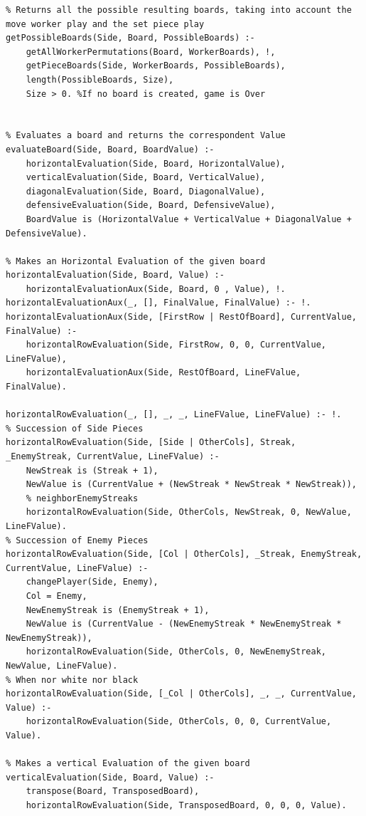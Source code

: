 \documentclass[a4paper]{article}
\begin{document}
\begin{lstlisting}
% Returns all the possible resulting boards, taking into account the move worker play and the set piece play
getPossibleBoards(Side, Board, PossibleBoards) :-
	getAllWorkerPermutations(Board, WorkerBoards), !,
	getPieceBoards(Side, WorkerBoards, PossibleBoards),
	length(PossibleBoards, Size),
	Size > 0. %If no board is created, game is Over


% Evaluates a board and returns the correspondent Value
evaluateBoard(Side, Board, BoardValue) :-
	horizontalEvaluation(Side, Board, HorizontalValue),
	verticalEvaluation(Side, Board, VerticalValue),
	diagonalEvaluation(Side, Board, DiagonalValue),
	defensiveEvaluation(Side, Board, DefensiveValue),
	BoardValue is (HorizontalValue + VerticalValue + DiagonalValue + DefensiveValue).

% Makes an Horizontal Evaluation of the given board
horizontalEvaluation(Side, Board, Value) :-
	horizontalEvaluationAux(Side, Board, 0 , Value), !.
horizontalEvaluationAux(_, [], FinalValue, FinalValue) :- !.
horizontalEvaluationAux(Side, [FirstRow | RestOfBoard], CurrentValue, FinalValue) :-
	horizontalRowEvaluation(Side, FirstRow, 0, 0, CurrentValue, LineFValue),
	horizontalEvaluationAux(Side, RestOfBoard, LineFValue, FinalValue).

horizontalRowEvaluation(_, [], _, _, LineFValue, LineFValue) :- !.
% Succession of Side Pieces
horizontalRowEvaluation(Side, [Side | OtherCols], Streak, _EnemyStreak, CurrentValue, LineFValue) :-
	NewStreak is (Streak + 1),
	NewValue is (CurrentValue + (NewStreak * NewStreak * NewStreak)),
	% neighborEnemyStreaks
	horizontalRowEvaluation(Side, OtherCols, NewStreak, 0, NewValue, LineFValue).
% Succession of Enemy Pieces
horizontalRowEvaluation(Side, [Col | OtherCols], _Streak, EnemyStreak, CurrentValue, LineFValue) :-
	changePlayer(Side, Enemy),
	Col = Enemy,
	NewEnemyStreak is (EnemyStreak + 1),
	NewValue is (CurrentValue - (NewEnemyStreak * NewEnemyStreak * NewEnemyStreak)),
	horizontalRowEvaluation(Side, OtherCols, 0, NewEnemyStreak, NewValue, LineFValue).
% When nor white nor black
horizontalRowEvaluation(Side, [_Col | OtherCols], _, _, CurrentValue, Value) :-
	horizontalRowEvaluation(Side, OtherCols, 0, 0, CurrentValue, Value).

% Makes a vertical Evaluation of the given board
verticalEvaluation(Side, Board, Value) :-
	transpose(Board, TransposedBoard),
	horizontalRowEvaluation(Side, TransposedBoard, 0, 0, 0, Value).


\end{lstlisting}
\end{document}

